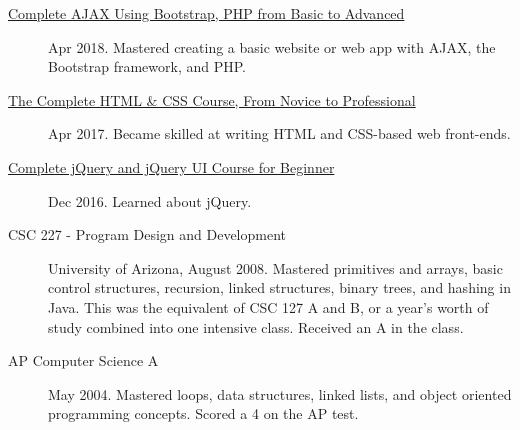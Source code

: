 \documentclass{article}
\begin{document}
\begin{description}
  \item [\href{https://www.udemy.com/certificate/UC-E3EMJE4O}{Complete AJAX Using Bootstrap, PHP from Basic to Advanced}] Apr 2018. Mastered creating a basic website or web app with AJAX, the Bootstrap framework, and PHP.
  \item [\href{https://www.udemy.com/certificate/UC-QZDWYX3V}{The Complete HTML \& CSS Course, From Novice to Professional}] Apr 2017. Became skilled at writing HTML and CSS-based web front-ends.
  \item [\href{https://www.udemy.com/certificate/UC-4V285L2N}{Complete jQuery and jQuery UI Course for Beginner}] Dec 2016. Learned about jQuery.
  \item [CSC 227 - Program Design and Development] University of Arizona, August 2008. Mastered primitives and arrays, basic control structures, recursion, linked structures, binary trees, and hashing in Java. This was the equivalent of CSC 127 A and B, or a year's worth of study combined into one intensive class. Received an A in the class.
  \item [AP Computer Science A] May 2004. Mastered loops, data structures, linked lists, and object oriented programming concepts. Scored a 4 on the AP test.
\end{description}
\end{document}
